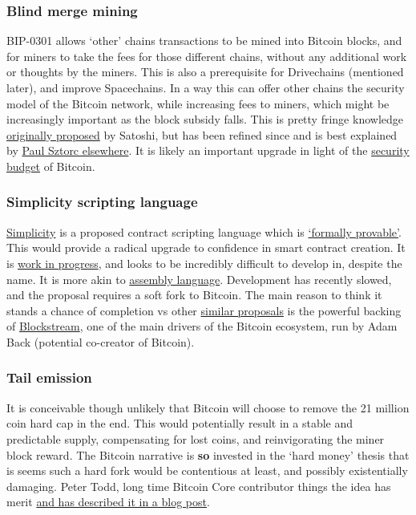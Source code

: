 \subsubsection{Blind merge mining}
BIP-0301 allows `other' chains transactions to be mined into Bitcoin blocks, and for miners to take the fees for those different chains, without any additional work or thoughts by the miners. This is also a prerequisite for Drivechains (mentioned later), and improve Spacechains. In a way this can offer other chains the security model of the Bitcoin network, while increasing fees to miners, which might be increasingly important as the block subsidy falls. This is pretty fringe knowledge \href{https://bitcointalk.org/index.php?topic=1790.msg28696#msg28696}{originally proposed} by Satoshi, but has been refined since and is best explained by \href{https://www.youtube.com/watch?v=xweFaw69EyA}{Paul Sztorc elsewhere}. It is likely an important upgrade in light of the \href{https://www.truthcoin.info/blog/security-budget/}{security budget} of Bitcoin.
\subsubsection{Simplicity scripting language}
\href{https://blockstream.com/simplicity.pdf}{Simplicity} is a proposed contract scripting language which is \href{https://coq.inria.fr/}{`formally provable'}. This would provide a radical upgrade to confidence in smart contract creation. It is \href{https://github.com/ElementsProject/simplicity/blob/pdf/Simplicity-TR.pdf}{work in progress}, and looks to be incredibly difficult to develop in, despite the name. It is more akin to \href{https://en.wikipedia.org/wiki/Assembly_language}{assembly language}. Development has recently slowed, and the proposal requires a soft fork to Bitcoin. The main reason to think it stands a chance of completion vs other \href{https://lists.linuxfoundation.org/pipermail/bitcoin-dev/2022-March/020036.html}{similar proposals} is the powerful backing of \href{https://blockstream.com/}{Blockstream}, one of the main drivers of the Bitcoin ecosystem, run by Adam Back (potential co-creator of Bitcoin). 
\subsubsection{Tail emission}
It is conceivable though unlikely that Bitcoin will choose to remove the 21 million coin hard cap in the end. This would potentially result in a stable and predictable supply, compensating for lost coins, and reinvigorating the miner block reward. The Bitcoin narrative is \textbf{so} invested in the `hard money' thesis that is seems such a hard fork would be contentious at least, and possibly existentially damaging. Peter Todd, long time Bitcoin Core contributor things the idea has merit \href{https://petertodd.org/2022/surprisingly-tail-emission-is-not-inflationary}{and has described it in a blog post}.
